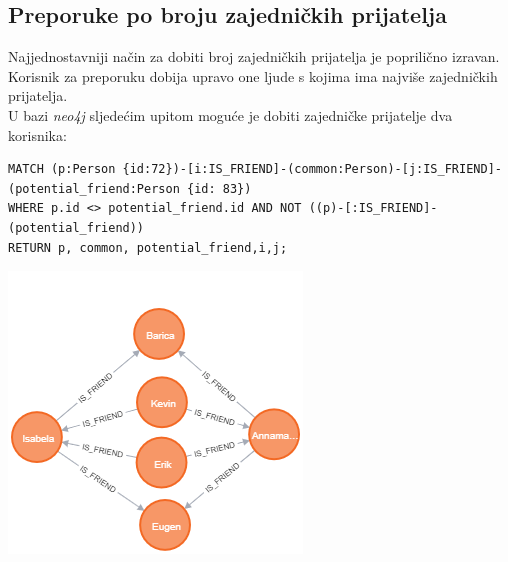 \documentclass[titlepage, 12pt]{scrartcl}
\begin{document}
\subsection*{Preporuke po broju zajedničkih prijatelja}
Najjednostavniji način za dobiti broj zajedničkih prijatelja je poprilično izravan. Korisnik za preporuku dobija upravo one ljude s kojima ima najviše zajedničkih prijatelja. \\
U bazi \emph{neo4j} sljedećim upitom moguće je dobiti zajedničke prijatelje dva korisnika:
\begin{samepage}
\begin{verbatim}
MATCH (p:Person {id:72})-[i:IS_FRIEND]-(common:Person)-[j:IS_FRIEND]-
(potential_friend:Person {id: 83}) 
WHERE p.id <> potential_friend.id AND NOT ((p)-[:IS_FRIEND]-(potential_friend)) 
RETURN p, common, potential_friend,i,j;
\end{verbatim}
\end{samepage}
\begin{center}
    \includegraphics[scale=0.7]{slike/common_friends_query.png}
\end{center}
\end{document}
